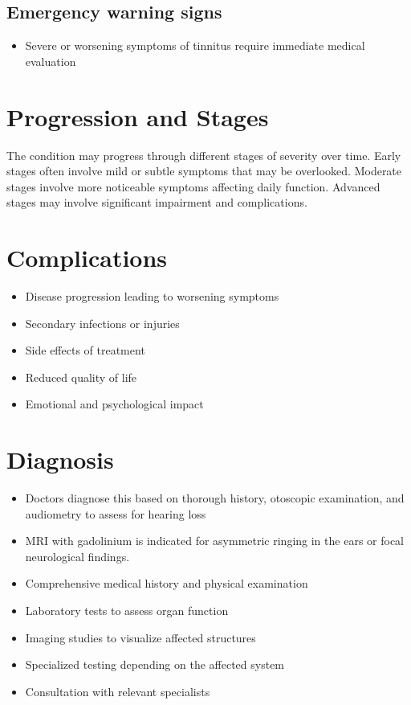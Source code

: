 \subsection{Emergency warning signs}
\begin{itemize}[noitemsep]
  \item Severe or worsening symptoms of tinnitus require immediate medical evaluation
\end{itemize}
\section{Progression and Stages}
The condition may progress through different stages of severity over time. Early stages often involve mild or subtle symptoms that may be overlooked. Moderate stages involve more noticeable symptoms affecting daily function. Advanced stages may involve significant impairment and complications.
\section{Complications}
\begin{itemize}[noitemsep]
  \item Disease progression leading to worsening symptoms
  \item Secondary infections or injuries
  \item Side effects of treatment
  \item Reduced quality of life
  \item Emotional and psychological impact
\end{itemize}
\section{Diagnosis}
\begin{itemize}[noitemsep]
  \item Doctors diagnose this based on thorough history, otoscopic examination, and audiometry to assess for hearing loss
  \item MRI with gadolinium is indicated for asymmetric ringing in the ears or focal neurological findings.
  \item Comprehensive medical history and physical examination
  \item Laboratory tests to assess organ function
  \item Imaging studies to visualize affected structures
  \item Specialized testing depending on the affected system
  \item Consultation with relevant specialists
\end{itemize}
